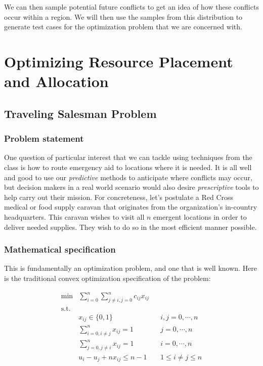 \documentclass{article} %
\begin{document}
We can then sample potential future conflicts to get an idea of how these conflicts occur within a region. We will then use the samples from this distribution to generate test cases for the optimization problem that we are concerned with.

\section{Optimizing Resource Placement and Allocation}

\subsection*{Traveling Salesman Problem}

\subsubsection*{Problem statement}

One question of particular interest that we can tackle using techniques from the class is how to route emergency aid
to locations where it is needed.  It is all well and good to use our \emph{predictive} methods to anticipate where
conflicts may occur, but decision makers in a real world scenario would also desire \emph{prescriptive} tools to help
carry out their mission. For concreteness, let's postulate a Red Cross medical or food supply caravan that originates
from the organization's in-country headquarters. This caravan wishes to visit all $n$ emergent locations in order to
deliver needed supplies. They wish to do so in the most efficient manner possible.

\subsubsection*{Mathematical specification}

This is fundamentally an optimization problem, and one that is well known. Here is the traditional convex optimization
specification of the problem:

\begin{align*}
\min &\sum_{i=0}^n \sum_{j\ne i,j=0}^nc_{ij}x_{ij} &&  \\
\mathrm{s.t.} & \\
	& x_{ij} \in \{0, 1\} && i,j=0, \cdots, n \\
	& \sum_{i=0,i\ne j}^n x_{ij} = 1 && j=0, \cdots, n \\
	& \sum_{j=0,j\ne i}^n x_{ij} = 1 && i=0, \cdots, n \\
	&u_i-u_j +nx_{ij} \le n-1 && 1 \le i \ne j \le n
\end{align*}
\end{document}
